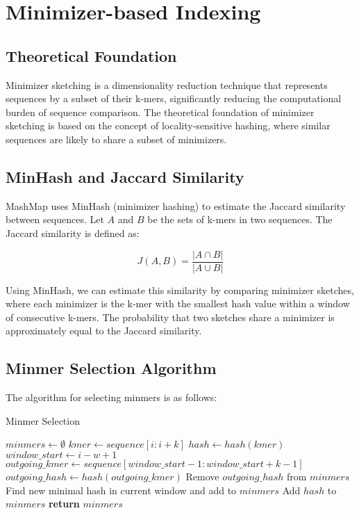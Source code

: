 \documentclass{article}
\begin{document}
\section{Minimizer-based Indexing}

\subsection{Theoretical Foundation}

Minimizer sketching is a dimensionality reduction technique that represents sequences by a subset of their k-mers, significantly reducing the computational burden of sequence comparison. The theoretical foundation of minimizer sketching is based on the concept of locality-sensitive hashing, where similar sequences are likely to share a subset of minimizers.

\subsection{MinHash and Jaccard Similarity}

MashMap uses MinHash (minimizer hashing) to estimate the Jaccard similarity between sequences. Let \(A\) and \(B\) be the sets of k-mers in two sequences. The Jaccard similarity is defined as:

\begin{equation}
J(A, B) = \frac{|A \cap B|}{|A \cup B|}
\end{equation}

Using MinHash, we can estimate this similarity by comparing minimizer sketches, where each minimizer is the k-mer with the smallest hash value within a window of consecutive k-mers. The probability that two sketches share a minimizer is approximately equal to the Jaccard similarity.

\subsection{Minmer Selection Algorithm}

The algorithm for selecting minmers is as follows:

\begin{algorithm}
\caption{Minmer Selection}
\begin{algorithmic}[1]
\State $minmers \gets \emptyset$
    \State $kmer \gets sequence[i:i+k]$
    \State $hash \gets hash(kmer)$
        \State $window\_start \gets i - w + 1$
        \State $outgoing\_kmer \gets sequence[window\_start-1:window\_start+k-1]$
        \State $outgoing\_hash \gets hash(outgoing\_kmer)$
            \State Remove $outgoing\_hash$ from $minmers$
            \State Find new minimal hash in current window and add to $minmers$
        \EndIf
    \EndIf
        \State Add $hash$ to $minmers$
    \EndIf
\EndFor
\State \textbf{return} $minmers$
\EndProcedure
\end{algorithmic}
\end{algorithm}
\end{document}

